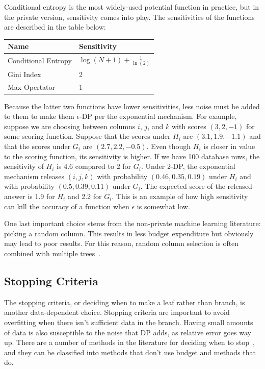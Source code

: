 \documentclass[11pt]{report}
\begin{document}
Conditional entropy is the most widely-used potential function in practice, but in the private version, sensitivity comes into play. The sensitivities of the functions are described in the table below:
\begin{center}
\begin{tabular}{|l|l|}
\hline
Name & Sensitivity \\ \hline
Conditional Entropy & $\log(N+1) + \frac{1}{\ln(2)}$ \\ \hline
Gini Index & 2 \\ \hline
Max Opertator & 1 \\ \hline
\end{tabular}
\end{center}
Because the latter two functions have lower sensitivities, less noise must be added to them to make them $\epsilon$-DP per the exponential mechanism. For example, suppose we are choosing between columns $i$, $j$, and $k$ with scores $(3,2,-1)$ for some scoring function. Suppose that the scores under $H_i$ are $(3.1, 1.9, -1.1)$ and that the scores under $G_i$ are $(2.7, 2.2, -0.5)$. Even though $H_i$ is closer in value to the scoring function, its sensitivity is higher. If we have 100 database rows, the sensitivity of $H_i$ is 4.6 compared to 2 for $G_i$. Under 2-DP, the exponential mechanism releases $(i,j,k)$ with probability $(0.46, 0.35, 0.19)$ under $H_i$ and with probability $(0.5, 0.39, 0.11)$ under $G_i$. The expected score of the released answer is 1.9 for $H_i$ and 2.2 for $G_i$. This is an example of how high sensitivity can kill the accuracy of a function when $\epsilon$ is somewhat low.

One last important choice stems from the non-private machine learning literature: picking a random column. This results in less budget expenditure but obviously may lead to poor results. For this reason, random column selection is often combined with multiple trees~\cite{Jagannathan:2009}.

\subsection{Stopping Criteria}
The stopping criteria, or deciding when to make a leaf rather than branch, is another data-dependent choice. Stopping criteria are important to avoid overfitting when there isn't sufficient data in the branch. Having small amounts of data is also susceptible to the noise that DP adds, as relative error goes way up. There are a number of methods in the literature for deciding when to stop~\cite{Fletcher:2016}, and they can be classified into methods that don't use budget and methods that do.
\end{document}
